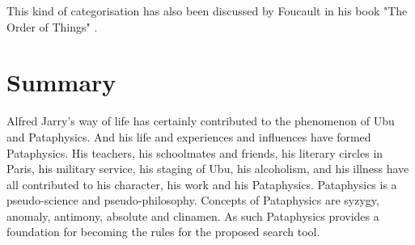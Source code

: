 This kind of categorisation has also been discussed by Foucault in his book "The Order of Things" \citep{Foucault1966}.

\section*{Summary}

Alfred Jarry's way of life has certainly contributed to the phenomenon of Ubu and Pataphysics. And his life and experiences and influences have formed Pataphysics. His teachers, his schoolmates and friends, his literary circles in Paris, his military service, his staging of Ubu, his alcoholism, and his illness have all contributed to his character, his work and his Pataphysics.
Pataphysics is a pseudo-science and pseudo-philosophy. Concepts of Pataphysics are syzygy, anomaly, antimony, absolute and clinamen. As such Pataphysics provides a foundation for becoming the rules for the proposed search tool.
